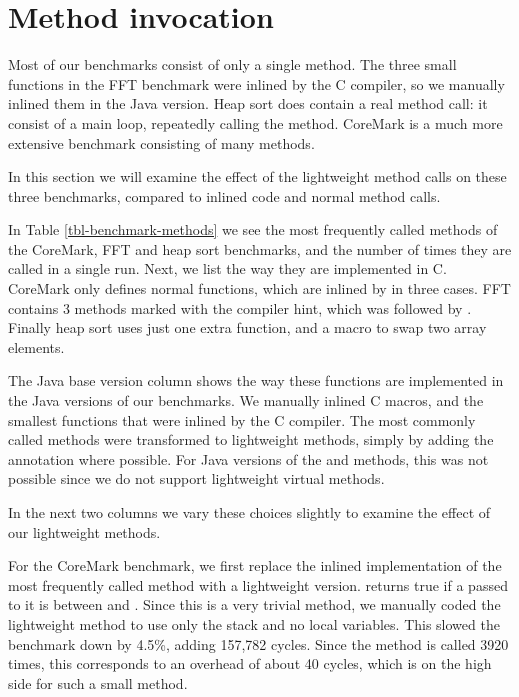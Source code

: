 \section{Method invocation}
\label{sec-method-invocation}


Most of our benchmarks consist of only a single method. The three small functions in the FFT benchmark were inlined by the C compiler, so we manually inlined them in the Java version. Heap sort does contain a real method call: it consist of a main loop, repeatedly calling the  method. CoreMark is a much more extensive benchmark consisting of many methods.

In this section we will examine the effect of the lightweight method calls on these three benchmarks, compared to inlined code and normal method calls.

In Table \ref{tbl-benchmark-methods} we see the most frequently called methods of the CoreMark, FFT and heap sort benchmarks, and the number of times they are called in a single run. Next, we list the way they are implemented in C. CoreMark only defines normal functions, which are inlined by  in three cases. FFT contains 3 methods marked with the  compiler hint, which was followed by . Finally heap sort uses just one extra function, and a macro to swap two array elements.

The Java base version column shows the way these functions are implemented in the Java versions of our benchmarks. We manually inlined C macros, and the smallest functions that were inlined by the C compiler. The most commonly called methods were transformed to lightweight methods, simply by adding the  annotation where possible. For Java versions of the  and  methods, this was not possible since we do not support lightweight virtual methods.

In the next two columns we vary these choices slightly to examine the effect of our lightweight methods.

For the CoreMark benchmark, we first replace the inlined implementation of the most frequently called method with a lightweight version.  returns true if a  passed to it is between  and . Since this is a very trivial method, we manually coded the lightweight method to use only the stack and no local variables. This slowed the benchmark down by 4.5\%, adding 157,782 cycles. Since the method is called 3920 times, this corresponds to an overhead of about 40 cycles, which is on the high side for such a small method.

